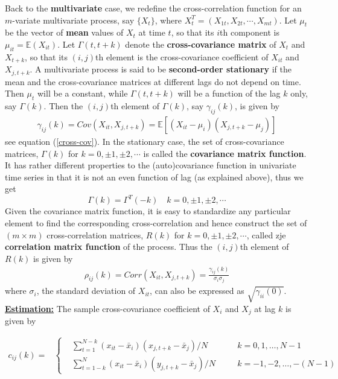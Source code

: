 Back to the \textbf{multivariate} case, we redefine the cross-correlation function for an $m$-variate multivariate process, say $\{X_t\}$, where $X_t^T=(X_{1t},X_{2t},\cdots,X_{mt})$. Let $\mu_t$ be the vector of \textbf{mean} values of $X_t$ at time $t$, so that its $i$th component is $\mu_{it}=\mathbb{E}(X_{it})$. Let $\Gamma(t,t+k)$ denote the \textbf{cross-covariance matrix} of $X_t$ and $X_{t+k}$, so that its $(i,j)$th element is the cross-covariance coefficient of $X_{it}$ and $X_{j,t+k}$. A multivariate process is said to be \textbf{second-order stationary} if the mean and the cross-covariance matrices at different lags do not depend on time. Then $\mu_t$ will be a constant, while $\Gamma(t,t+k)$ will be a function of the lag $k$ only, say $\Gamma(k)$. Then the $(i,j)$th element of $\Gamma(k)$, say $\gamma_{ij}(k)$, is given by 
\begin{align}
    \gamma_{ij}(k)=Cov(X_{it},X_{j,t+k})= \mathbb{E}[(X_{it}-\mu_i)(X_{j,t+k}-\mu_j)]
\end{align}
see equation (\ref{cross-cov}). In the stationary case, the set of cross-covariance matrices, $\Gamma(k)$ for $k=0,\pm 1,\pm 2,\cdots$ is called the \textbf{covariance matrix function}. \\
It has rather different properties to the (auto)covariance function in univariate time series in that it is not an even function of lag (as explained above), thus we get \[
\Gamma(k)=\Gamma^T(-k) \quad k=0,\pm1,\pm2,\cdots
\]
Given the covariance matrix function, it is easy to standardize any particular element to find the corresponding cross-correlation and hence construct the set of $(m\times m)$ cross-correlation matrices, $R(k)$ for $k=0,\pm1,\pm2,\cdots$, called zje \textbf{correlation matrix function} of the process. Thus the $(i,j)$th element of $R(k)$ is given by 
\begin{align}
    \rho_{ij}(k)=Corr(X_{it},X_{j,t+k})= \frac{\gamma_{ij}(k)}{\sigma_i \sigma_j}
\end{align}
\quad where $\sigma_i$, the standard deviation of $X_{it}$, can also be expressed as $\sqrt{\gamma_{ii}(0)}$.\\

\noindent
\textbf{\underline{Estimation:}} The sample cross-covariance coefficient of $X_i$ and $X_j$ at lag $k$ is given by

\begin{equation}
\begin{split}
c_{ij}(k) = & \left\{
\begin{aligned}
    &\sum_{t=1}^{N-k} (x_{it} - \bar{x}_i)(x_{j,t+k} - \bar{x}_j)/N & \quad & k = 0, 1, \ldots, N-1 \\
    &\sum_{t=1-k}^{N} (x_{it} - \bar{x}_i)(y_{j,t+k} - \bar{x}_j)/N & \quad & k = -1, -2, \ldots, -(N-1)
\end{aligned}
\right.
\end{split}
\end{equation}

